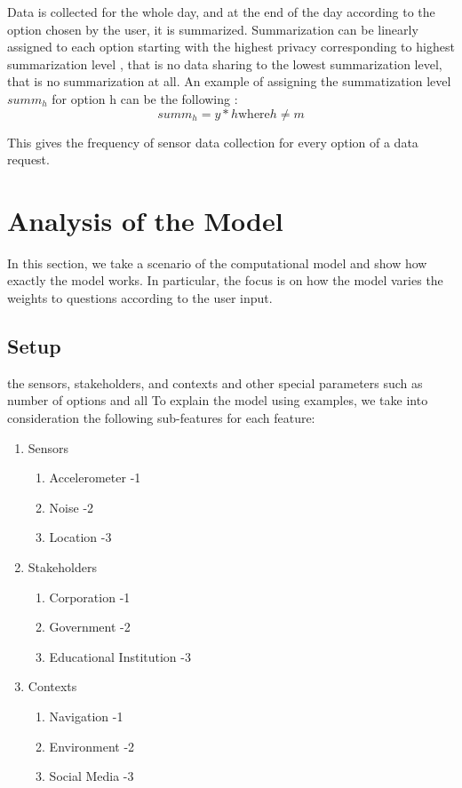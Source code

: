 Data is collected for the whole day, and at the end of the day according to the option chosen by the user, it is summarized. Summarization can
be linearly assigned to each option starting with the highest privacy corresponding to highest summarization level , that is no data sharing to
the lowest summarization level, that is no summarization at all. An example of assigning the summatization level $summ_{h}$ for option h can be the following :
\begin{equation}
summ_{h} = y*h \text{where} h \neq m
\end{equation}

This gives the frequency of sensor data collection for every option of a data request.

\section{Analysis of the Model} \label{analysis_model}
In this section, we take a scenario of the computational model and show how exactly the model works. In particular, the focus is 
on how the model varies the weights to questions according to the user input.

\subsection{Setup}
the sensors, stakeholders, and contexts and other special parameters such as number of options and all
To explain the model using examples, we take into consideration the following sub-features for each feature:

\begin{enumerate}
    \item Sensors
    \begin{enumerate}
    \item Accelerometer -1
    \item Noise -2
    \item Location -3
   \end{enumerate}
    \item Stakeholders 
    \begin{enumerate}
    \item Corporation -1
    \item Government -2
    \item Educational Institution -3
   \end{enumerate}
   \item Contexts
    \begin{enumerate}
    \item Navigation -1
    \item Environment -2
    \item Social Media -3
   \end{enumerate}
 \end{enumerate}
 
